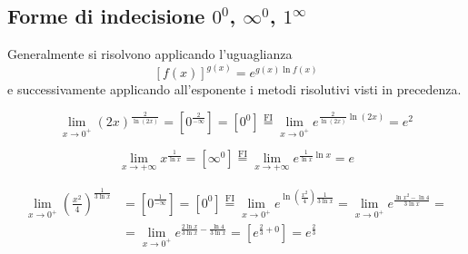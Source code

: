 \documentclass{book}     %
\begin{document}
\subsection{Forme di indecisione $0^0$, $\infty^0$, $1^\infty$}
Generalmente si risolvono applicando l'uguaglianza \[\left[f(x)\right]^{g(x)}=e^{g(x)\ln f(x)}\]
e successivamente applicando all'esponente i metodi risolutivi visti in precedenza.
\begin{ex}
\[\lim_{x\to0^+}(2x)^{\frac{2}{\ln(2x)}}=\left[0^\frac{2}{-\infty}\right]=\left[0^0\right]\overset{\mathrm{FI}}{=}\lim_{x\to0^+}e^{\frac{2}{\ln(2x)}\ln(2x)}=e^2\]
\end{ex}
\begin{ex}
\[\lim_{x\to+\infty}x^\frac{1}{\ln x}=\left[\infty^0\right]\overset{\mathrm{FI}}{=}\lim_{x\to+\infty}e^{\frac{1}{\ln x}\ln x}=e\]
\end{ex}
\begin{ex}
\[\begin{aligned}\lim_{x\to 0^+}\left(\frac{x^2}{4}\right)^\frac{1}{3\ln x}&=\left[0^\frac{1}{-\infty}\right]=\left[0^0\right]\overset{\mathrm{FI}}{=}\lim_{x\to0^+}e^{\ln\left(\frac{x^2}{4}\right)\frac{1}{3\ln x}}=\lim_{x\to0^+}e^{\frac{\ln x^2-\ln4}{3\ln x}} =\\&=\lim_{x\to0^+}e^{\frac{2\ln x}{3\ln x}-\frac{\ln4}{3\ln x}}=\left[e^{\frac{2}{3}+0}\right]=e^\frac{2}{3}\end{aligned}\]
\end{ex}
\end{document}
